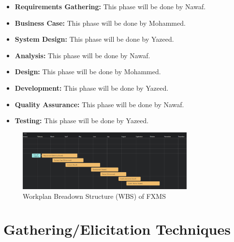 \documentclass[a4paper]{report}
\begin{document}
\begin{itemize}
    \item \textbf{Requirements Gathering:} This phase will be done by Nawaf.
    \item \textbf{Business Case:} This phase will be done by Mohammed.
    \item \textbf{System Design:} This phase will be done by Yazeed.
    \item \textbf{Analysis:} This phase will be done by Nawaf.
    \item \textbf{Design:} This phase will be done by Mohammed.
    \item \textbf{Development:} This phase will be done by Yazeed.
    \item \textbf{Quality Assurance:} This phase will be done by Nawaf.
    \item \textbf{Testing:} This phase will be done by Yazeed.
\end{itemize}

\begin{figure}[h!]
    \centering
    \includegraphics[width=0.8\textwidth]{images/wbs.png}
    \caption{Workplan Breadown Structure (WBS) of FXMS}
    \label{fig:wbs}
\end{figure}

\chapter{Gathering/Elicitation Techniques}
\end{document}
